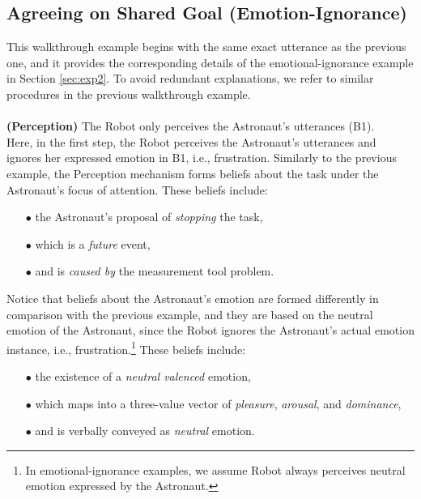 \subsection{Agreeing on Shared Goal (Emotion-Ignorance)}
\label{sec:wt-exp2}

This walkthrough example begins with the same exact utterance as the previous
one, and it provides the corresponding details of the emotional-ignorance
example in Section \ref{sec:exp2}. To avoid redundant explanations, we refer to
similar procedures in the previous walkthrough example.\\

\noindent{}\\

\noindent\textbf{(Perception)} The Robot only perceives the Astronaut's
utterances (B1).\\

Here, in the first step, the Robot perceives the Astronaut's utterances and
ignores her expressed emotion in B1, i.e., frustration. Similarly to the
previous example, the Perception mechanism forms beliefs about the task under
the Astronaut's focus of attention. These beliefs include:

\begin{itemize}
  \item[$\bullet$] the Astronaut's proposal of \textit{stopping} the task,
  \item[$\bullet$] which is a \textit{future} event,
  \item[$\bullet$] and is \textit{caused by} the measurement tool problem.
\end{itemize}

\noindent Notice that beliefs about the Astronaut's emotion are formed
differently in comparison with the previous example, and they are based on the
neutral emotion of the Astronaut, since the Robot ignores the Astronaut's actual
emotion instance, i.e., frustration.\footnote{In emotional-ignorance examples,
we assume Robot always perceives neutral emotion expressed by the Astronaut.} These
beliefs include:

\begin{itemize}
  \item[$\bullet$] the existence of a \textit{neutral valenced} emotion,
  \item[$\bullet$] which maps into a three-value vector of \textit{pleasure},
  \textit{arousal}, and \textit{dominance},
  \item[$\bullet$] and is verbally conveyed as \textit{neutral} emotion.\\
\end{itemize}

